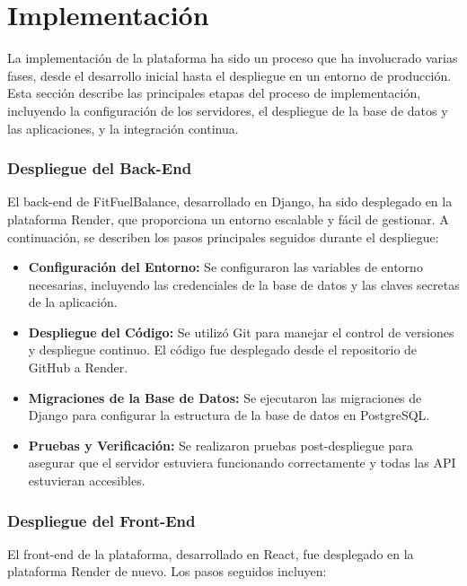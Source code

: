 \section{Implementación}

La implementación de la plataforma ha sido un proceso que ha involucrado varias fases, desde el desarrollo inicial hasta el despliegue en un entorno de producción. Esta sección describe las principales etapas del proceso de implementación, incluyendo la configuración de los servidores, el despliegue de la base de datos y las aplicaciones, y la integración continua.

\subsubsection{Despliegue del Back-End}
El back-end de FitFuelBalance, desarrollado en Django, ha sido desplegado en la plataforma Render, que proporciona un entorno escalable y fácil de gestionar. A continuación, se describen los pasos principales seguidos durante el despliegue:

\begin{itemize}
    \item \textbf{Configuración del Entorno:} Se configuraron las variables de entorno necesarias, incluyendo las credenciales de la base de datos y las claves secretas de la aplicación.
    \item \textbf{Despliegue del Código:} Se utilizó Git para manejar el control de versiones y despliegue continuo. El código fue desplegado desde el repositorio de GitHub a Render.
    \item \textbf{Migraciones de la Base de Datos:} Se ejecutaron las migraciones de Django para configurar la estructura de la base de datos en PostgreSQL.
    \item \textbf{Pruebas y Verificación:} Se realizaron pruebas post-despliegue para asegurar que el servidor estuviera funcionando correctamente y todas las API estuvieran accesibles.
\end{itemize}

\subsubsection{Despliegue del Front-End}
El front-end de la plataforma, desarrollado en React, fue desplegado en la plataforma Render de nuevo. Los pasos seguidos incluyen:


